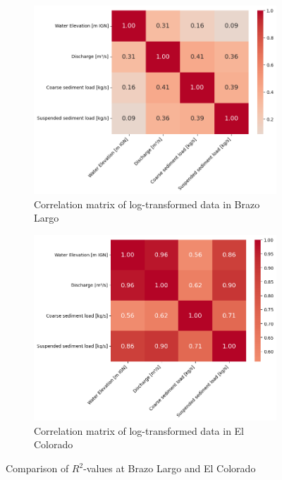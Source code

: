 \begin{figure}[h!]
    \centering
    \begin{subfigure}[b]{0.48\linewidth}
        \centering        \includegraphics[width=\linewidth]{figures/ch5/logcorrelations Brazo Largo.png}
        \caption{Correlation matrix of log-transformed data in Brazo Largo}
        \label{fig:logcorrelation brazo}
    \end{subfigure}
    \hfill
    \begin{subfigure}[b]{0.48\linewidth}
        \centering
        \includegraphics[width=\linewidth]{figures/ch5/logcorrelations Bermejo.png}
        \caption{Correlation matrix of log-transformed data in El Colorado}
        \label{fig:logcorrelation bermejo}
    \end{subfigure}
    
    \caption{Comparison of $R^2$-values at Brazo Largo and El Colorado}
    \label{fig:correlationmatrices}
\end{figure}




